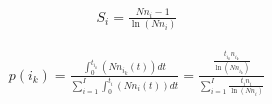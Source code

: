 \documentclass[10pt]{jsarticle}
\begin{document}
\begin{align}
 S_i = \frac{Nn_i - 1}{\ln \left( Nn_i \right)}
\end{align}

\begin{align}
 p(i_k) = \frac{\int_{0}^{t_{i_k}} \left(Nn_{i_k}(t) \right) dt}{\sum_{i=1}^{I} \int_{0}^{t_i} \left(Nn_{i}(t) \right) dt} = \frac{\frac{t_{i_k}n_{i_k}}{\ln \left(N n_{i_k} \right)}}{\sum_{i=1}^{I}\frac{t_{i}n_{i}}{\ln \left(N n_{i} \right)}}
\end{align}
{}

\end{document}
